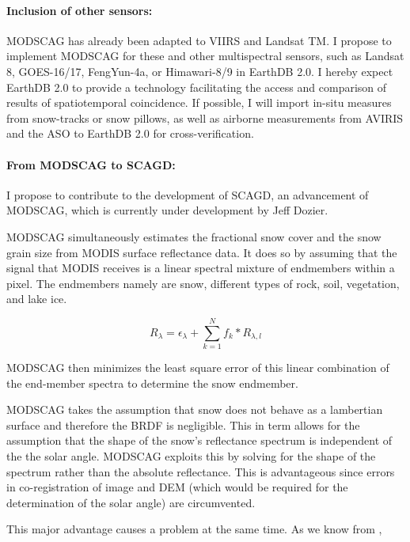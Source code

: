 \documentclass[letterpaper, parskip=half]{scrartcl}
\begin{document}
\paragraph{Inclusion of other sensors:}
MODSCAG has already been adapted to VIIRS and Landsat TM. I propose to implement MODSCAG for these and other multispectral sensors, such as Landsat 8, \gls{GOES}-16/17, FengYun-4a, or Himawari-8/9 in EarthDB 2.0. I hereby expect EarthDB 2.0 to provide a technology facilitating the access and comparison of results of spatiotemporal coincidence. If possible, I will import in-situ measures from snow-tracks or snow pillows, as well as airborne measurements from \gls{AVIRIS} and the \gls{ASO} to EarthDB 2.0 for cross-verification.

\paragraph{From \gls{MODSCAG} to \gls{SCAGD}:}
I propose to contribute to the development of \gls{SCAGD}, an advancement of \gls{MODSCAG}, which is currently under development by Jeff Dozier.

MODSCAG simultaneously estimates the fractional snow cover and the snow grain size \citep{Painter2009} from MODIS surface reflectance data. It does so by assuming that the signal that MODIS receives is a linear spectral mixture of endmembers within a pixel. The endmembers namely are snow, different types of rock, soil, vegetation, and lake ice.

\begin{equation}
 R_\lambda = \epsilon_{\lambda} + \sum_{k=1}^N f_k* R_{\lambda, l}
\end{equation}

MODSCAG then minimizes the least square error of this linear combination of the end-member spectra to determine the snow endmember.

MODSCAG takes the assumption that snow does not behave as a lambertian surface and therefore the \gls{BRDF} is negligible. 
This in term allows for the assumption that the shape of the snow's reflectance spectrum is independent of the the solar angle. MODSCAG exploits this by solving for the shape of the spectrum rather than the absolute reflectance. This is advantageous since errors in co-registration of image and DEM (which would be required for the determination of the solar angle) are circumvented.

This major advantage causes a problem at the same time. As we know from \cite{Warren1982}, 
\end{document}
